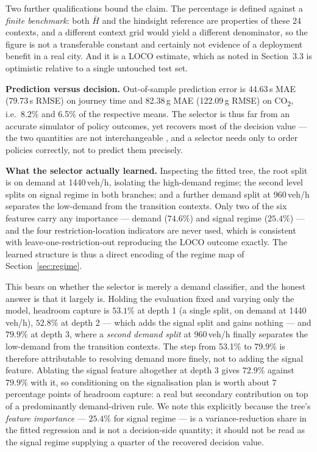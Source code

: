 \documentclass[10pt,a4paper]{article}
\newcommand{\CO}{CO\textsubscript{2}}
\begin{document}
Two further qualifications bound the claim. The percentage is defined against a \emph{finite benchmark}: both $\bar H$ and the hindsight reference are properties of these 24 contexts, and a different context grid would yield a different denominator, so the figure is not a transferable constant and certainly not evidence of a deployment benefit in a real city. And it is a LOCO estimate, which as noted in Section~3.3 is optimistic relative to a single untouched test set.

\textbf{Prediction versus decision.} Out-of-sample prediction error is 44.63\,s MAE (79.73\,s RMSE) on journey time and 82.38\,g MAE (122.09\,g RMSE) on \CO, i.e.\ 8.2\% and 6.5\% of the respective means. The selector is thus far from an accurate simulator of policy outcomes, yet recovers most of the decision value --- the two quantities are not interchangeable \cite{elmachtoub2022smart}, and a selector needs only to order policies correctly, not to predict them precisely.

\textbf{What the selector actually learned.} Inspecting the fitted tree, the root split is on demand at 1440\,veh/h, isolating the high-demand regime; the second level splits on signal regime in both branches; and a further demand split at 960\,veh/h separates the low-demand from the transition contexts. Only two of the six features carry any importance --- demand ($74.6\%$) and signal regime ($25.4\%$) --- and the four restriction-location indicators are never used, which is consistent with leave-one-restriction-out reproducing the LOCO outcome exactly. The learned structure is thus a direct encoding of the regime map of Section~\ref{sec:regime}.

This bears on whether the selector is merely a demand classifier, and the honest answer is that it largely is. Holding the evaluation fixed and varying only the model, headroom capture is $53.1\%$ at depth 1 (a single split, on demand at 1440\,veh/h), $52.8\%$ at depth 2 --- which adds the signal split and gains nothing --- and $79.9\%$ at depth 3, where a \emph{second demand split} at 960\,veh/h finally separates the low-demand from the transition contexts. The step from 53.1\% to 79.9\% is therefore attributable to resolving demand more finely, not to adding the signal feature. Ablating the signal feature altogether at depth 3 gives $72.9\%$ against $79.9\%$ with it, so conditioning on the signalisation plan is worth about $7$ percentage points of headroom capture: a real but secondary contribution on top of a predominantly demand-driven rule. We note this explicitly because the tree's \emph{feature importance} --- $25.4\%$ for signal regime --- is a variance-reduction share in the fitted regression and is not a decision-side quantity; it should not be read as the signal regime supplying a quarter of the recovered decision value.
\end{document}
